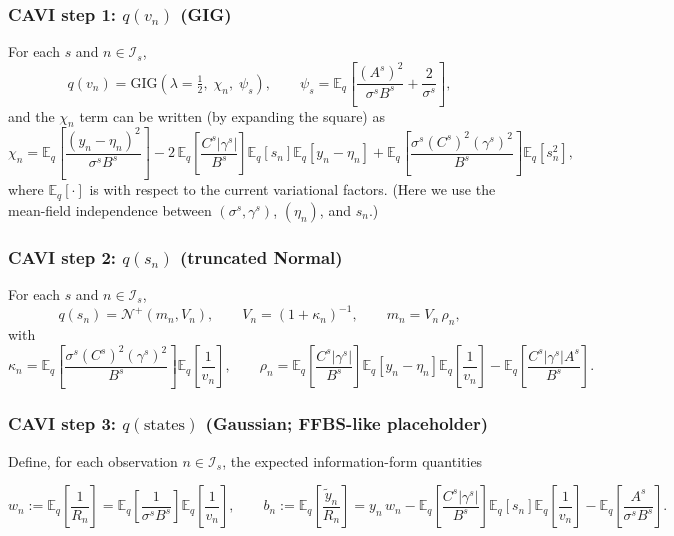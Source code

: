 \documentclass[11pt]{article}
\newcommand{\1}{\mathbb{I}}
\newcommand{\N}{\mathcal{N}}
\newcommand{\GIG}{\mathrm{GIG}}
\newcommand{\E}{\mathbb{E}}
\begin{document}
\subsubsection*{CAVI step 1: $q(v_n)$ (GIG)}
For each $s$ and $n\in\mathcal{I}_s$,
\begin{equation}
q(v_n)=\GIG\!\left(\lambda=\tfrac12,\;\chi_n,\;\psi_s\right),
\qquad
\psi_s=\E_q\!\left[\frac{(A^s)^2}{\sigma^s B^s}+\frac{2}{\sigma^s}\right],
\label{eq:vb_qv}
\end{equation}
and the $\chi_n$ term can be written (by expanding the square) as
\begin{equation}
\chi_n
=
\E_q\!\left[\frac{(y_n-\eta_n)^2}{\sigma^s B^s}\right]
-2\,\E_q\!\left[\frac{C^s|\gamma^s|}{B^s}\right]\E_q[s_n]\E_q[y_n-\eta_n]
+\E_q\!\left[\frac{\sigma^s (C^s)^2(\gamma^s)^2}{B^s}\right]\E_q[s_n^2],
\label{eq:vb_chi}
\end{equation}
where $\E_q[\cdot]$ is with respect to the current variational factors.
(Here we use the mean-field independence between $(\sigma^s,\gamma^s)$, $(\eta_n)$, and $s_n$.)

\subsubsection*{CAVI step 2: $q(s_n)$ (truncated Normal)}
For each $s$ and $n\in\mathcal{I}_s$,
\begin{equation}
q(s_n)=\N^+(m_n,V_n),
\qquad
V_n=(1+\kappa_n)^{-1},
\qquad
m_n=V_n\,\rho_n,
\label{eq:vb_qs}
\end{equation}
with
\begin{equation}
\kappa_n
=
\E_q\!\left[\frac{\sigma^s (C^s)^2(\gamma^s)^2}{B^s}\right]\E_q\!\left[\frac{1}{v_n}\right],
\qquad
\rho_n
=
\E_q\!\left[\frac{C^s|\gamma^s|}{B^s}\right]\E_q[y_n-\eta_n]\E_q\!\left[\frac{1}{v_n}\right]
-\E_q\!\left[\frac{C^s|\gamma^s|A^s}{B^s}\right].
\label{eq:vb_kappa_rho}
\end{equation}

\subsubsection*{CAVI step 3: $q(\text{states})$ (Gaussian; FFBS-like placeholder)}
Define, for each observation $n\in\mathcal{I}_s$, the expected information-form quantities

\begin{equation}
w_n := \E_q\!\left[\frac{1}{R_n}\right]
=
\E_q\!\left[\frac{1}{\sigma^s B^s}\right]\E_q\!\left[\frac{1}{v_n}\right],
\qquad
b_n := \E_q\!\left[\frac{\tilde y_n}{R_n}\right]
=
y_n\,w_n
-\E_q\!\left[\frac{C^s|\gamma^s|}{B^s}\right]\E_q[s_n]\E_q\!\left[\frac{1}{v_n}\right]
-\E_q\!\left[\frac{A^s}{\sigma^s B^s}\right].
\label{eq:vb_info_wb}
\end{equation}
\end{document}
